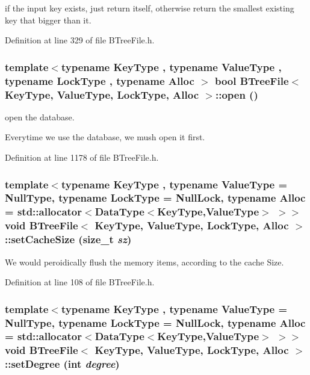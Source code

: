 if the input key exists, just return itself, otherwise return the smallest existing key that bigger than it. 

Definition at line 329 of file BTreeFile.h.\hypertarget{classBTreeFile_dbbf4c18dcccd9f9d231a5d546ff4fe6}{
\subsubsection[{open}]{\setlength{\rightskip}{0pt plus 5cm}template$<$typename KeyType , typename ValueType , typename LockType , typename Alloc $>$ bool {\bf BTreeFile}$<$ KeyType, ValueType, LockType, Alloc $>$::open ()}}
\label{classBTreeFile_dbbf4c18dcccd9f9d231a5d546ff4fe6}


open the database. 

Everytime we use the database, we mush open it first. 

Definition at line 1178 of file BTreeFile.h.\hypertarget{classBTreeFile_5a758e56495e400540e2829601e06de7}{
\subsubsection[{setCacheSize}]{\setlength{\rightskip}{0pt plus 5cm}template$<$typename KeyType , typename ValueType  = NullType, typename LockType  = NullLock, typename Alloc  = std::allocator$<$DataType$<$KeyType,ValueType$>$ $>$$>$ void {\bf BTreeFile}$<$ KeyType, ValueType, LockType, Alloc $>$::setCacheSize (size\_\-t {\em sz})}}
\label{classBTreeFile_5a758e56495e400540e2829601e06de7}


We would peroidically flush the memory items, according to the cache Size. 

Definition at line 108 of file BTreeFile.h.\hypertarget{classBTreeFile_76116d6e74ebdd94b641e60466454da5}{
\subsubsection[{setDegree}]{\setlength{\rightskip}{0pt plus 5cm}template$<$typename KeyType , typename ValueType  = NullType, typename LockType  = NullLock, typename Alloc  = std::allocator$<$DataType$<$KeyType,ValueType$>$ $>$$>$ void {\bf BTreeFile}$<$ KeyType, ValueType, LockType, Alloc $>$::setDegree (int {\em degree})}}
\label{classBTreeFile_76116d6e74ebdd94b641e60466454da5}


